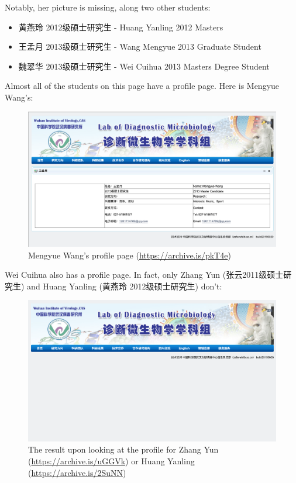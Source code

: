 \documentclass[11pt]{article}
\begin{document}
Notably, her picture is missing, along two other students:
\begin{itemize}
\item 黄燕玲 2012级硕士研究生 - Huang Yanling 2012 Masters
\item 王孟月 2013级硕士研究生 - Wang Mengyue 2013 Graduate Student
\item 魏翠华 2013级硕士研究生 - Wei Cuihua 2013 Masters Degree Student
\end{itemize}

Almost all of the students on this page have a profile page. Here is Mengyue Wang’s:
\begin{figure}[htbp]
\centering
\includegraphics[width=.9\linewidth]{./images/mengyue-wang-page.png}
\caption{Mengyue Wang’s profile page (\url{https://archive.is/pkT4e})}
\end{figure}

Wei Cuihua also has a profile page. In fact, only Zhang Yun (张云2011级硕士研究生) and Huang Yanling (黄燕玲 2012级硕士研究生) don't:
\begin{figure}[htbp]
\centering
\includegraphics[width=.9\linewidth]{./images/no-profile.png}
\caption{The result upon looking at the profile for Zhang Yun (\url{https://archive.is/uGGVk}) or Huang Yanling (\url{https://archive.is/2SuNN})}
\end{figure}
\end{document}

